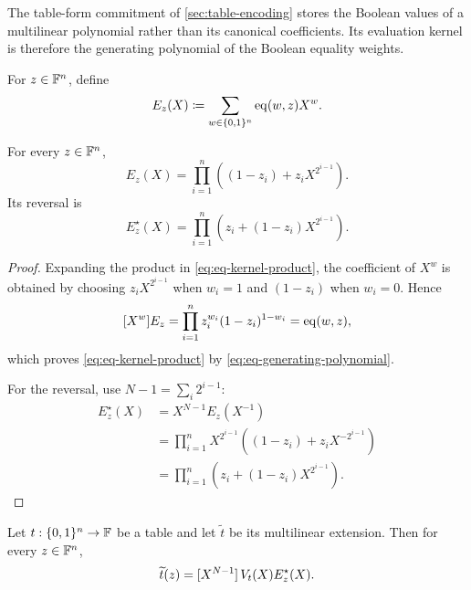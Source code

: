 The table-form commitment of \cref{sec:table-encoding} stores the Boolean values of a multilinear polynomial rather than its canonical coefficients.  Its evaluation kernel is therefore the generating polynomial of the Boolean equality weights.

For $z\in\mathbb{F}^n$, define
\begin{equation}
  E_z(X)
  \coloneqq
  \sum_{w\in\{0,1\}^n}\operatorname{eq}(w,z)X^w.
  \label{eq:eq-generating-polynomial}
\end{equation}

\begin{lemma}
\label{lem:eq-kernel-product}
For every $z\in\mathbb{F}^n$,
\begin{equation}
  E_z(X)
  =\prod_{i=1}^{n}\left((1-z_i)+z_iX^{2^{i-1}}\right).
  \label{eq:eq-kernel-product}
\end{equation}
Its reversal is
\begin{equation}
  E_z^{\star}(X)
  =\prod_{i=1}^{n}\left(z_i+(1-z_i)X^{2^{i-1}}\right).
  \label{eq:eq-kernel-reversal-product}
\end{equation}
\end{lemma}

\begin{proof}
Expanding the product in \eqref{eq:eq-kernel-product}, the coefficient of $X^w$ is obtained by choosing $z_iX^{2^{i-1}}$ when $w_i=1$ and $(1-z_i)$ when $w_i=0$.  Hence
\[
  [X^w]E_z
  =\prod_{i=1}^{n}z_i^{w_i}(1-z_i)^{1-w_i}
  =\operatorname{eq}(w,z),
\]
which proves \eqref{eq:eq-kernel-product} by \eqref{eq:eq-generating-polynomial}.

For the reversal, use $N-1=\sum_i2^{i-1}$:
\begin{align*}
  E_z^{\star}(X)
  &=X^{N-1}E_z(X^{-1})\\
  &=\prod_{i=1}^{n}X^{2^{i-1}}
      \left((1-z_i)+z_iX^{-2^{i-1}}\right)\\
  &=\prod_{i=1}^{n}\left(z_i+(1-z_i)X^{2^{i-1}}\right).
\end{align*}
\end{proof}

\begin{theorem}
\label{thm:table-evaluation-extraction}
Let $t:\{0,1\}^n\to\mathbb{F}$ be a table and let $\widetilde t$ be its multilinear extension.  Then for every $z\in\mathbb{F}^n$,
\begin{equation}
  \widetilde t(z)
  =[X^{N-1}]\,V_t(X)E_z^{\star}(X).
  \label{eq:table-evaluation-extraction}
\end{equation}
\end{theorem}

